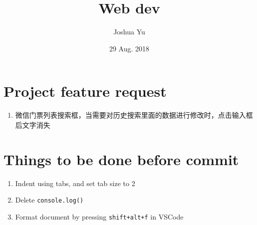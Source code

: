 \documentclass[a4paper, 12pt]{article}
\begin{document}

\large
\title{Web dev}
\author{Joshua Yu}
\date{29 Aug. 2018}
\maketitle
\tableofcontents


\section{Project feature request}
\begin{enumerate}
\item 微信门票列表搜索框，当需要对历史搜索里面的数据进行修改时，点击输入框后文字消失
\end{enumerate}

\section{Things to be done before commit}
\begin{enumerate}

\item Indent using tabs, and set tab size to 2

\item Delete \verb|console.log()|

\item Format document by pressing \verb|shift+alt+f| in VSCode

\end{enumerate}
\end{document}
